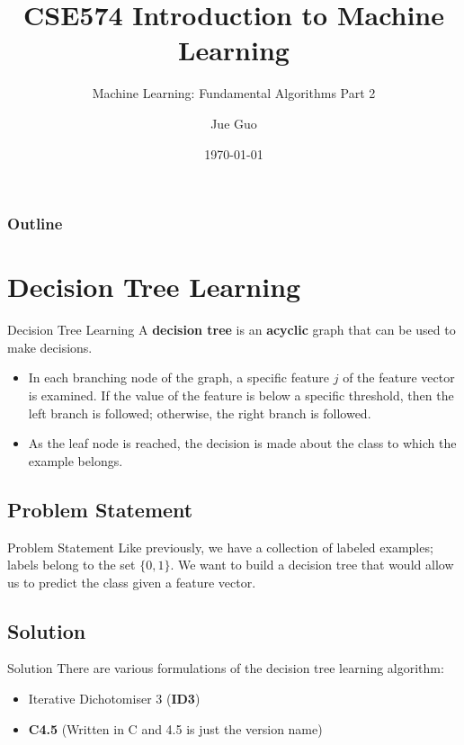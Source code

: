 \documentclass[9pt,dvipsnames]{beamer}
\title{CSE574 Introduction to Machine Learning}
\subtitle{Machine Learning: Fundamental Algorithms Part 2}
\author{Jue Guo}
\institute{University at Buffalo}
\date{\today}
\begin{document}
	\begin{frame}
		\titlepage
	\end{frame}
	
	\begin{frame}
		\frametitle{Outline}
		\tableofcontents
	\end{frame}
	\section{Decision Tree Learning}
	\begin{frame}{Decision Tree Learning}
		A \textbf{decision tree} is an \textbf{acyclic} graph that can be used to make decisions. 
		\begin{itemize}
			\item In each branching node of the graph, a specific feature $j$ of the feature vector is examined. If the value of the feature is below a specific threshold, then the left branch is followed; otherwise, the right branch is followed. 
			\item As the leaf node is reached, the decision is made about the class to which the example belongs.
		\end{itemize}
	\end{frame}
	\subsection{Problem Statement}
	\begin{frame}{Problem Statement}
		Like previously, we have a collection of labeled examples; labels belong to the set $\{0,1\}$. We want to build a decision tree that would allow us to predict the class given a feature vector.
	\end{frame}
	\subsection{Solution}
	\begin{frame}{Solution}
		There are various formulations of the decision tree learning algorithm: 
		\begin{itemize}
			\item Iterative Dichotomiser 3 (\textbf{ID3})
			\item \textbf{C4.5} (Written in C and 4.5 is just the version name)
		\end{itemize}
	\end{frame}
\end{document}
